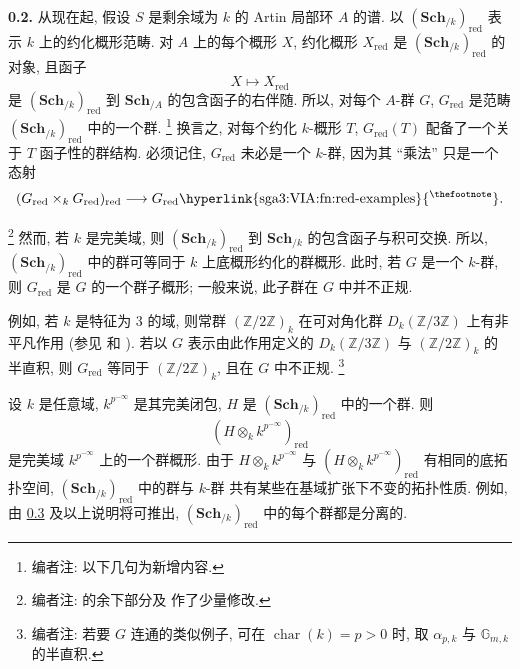 \medskip
\noindent\textbf{0.2.}
\label{sga3:VIA:0.2}
从现在起, 假设 \(S\) 是剩余域为 \(k\) 的 Artin 局部环 \(A\) 的谱.
以 \((\mathbf{Sch}_{/k})_{\mathrm{red}}\) 表示 \(k\) 上的约化概形范畴.
对 \(A\) 上的每个概形 \(X\), 约化概形 \(X_{\mathrm{red}}\)
是 \((\mathbf{Sch}_{/k})_{\mathrm{red}}\) 的对象,
且函子
\[
  X\longmapsto X_{\mathrm{red}}
\]
是 \((\mathbf{Sch}_{/k})_{\mathrm{red}}\) 到
\(\mathbf{Sch}_{/A}\) 的包含函子的右伴随.
所以, 对每个 \(A\)-群 \(G\), \(G_{\mathrm{red}}\)
是范畴 \((\mathbf{Sch}_{/k})_{\mathrm{red}}\) 中的一个群.
\footnote{编者注: 以下几句为新增内容.}
换言之, 对每个约化 \(k\)-概形 \(T\),
\(G_{\mathrm{red}}(T)\) 配备了一个关于 \(T\) 函子性的群结构.
必须记住, \(G_{\mathrm{red}}\) 未必是一个 \(k\)-群,
因为其 ``乘法'' 只是一个态射
%
\[
  (G_{\mathrm{red}}\times_k G_{\mathrm{red}})_{\mathrm{red}}
  \longrightarrow
  G_{\mathrm{red}}\text{\hyperlink{sga3:VIA:fn:red-examples}{%
    \textsuperscript{\normalfont\thefootnote}}}.
\]

\footnote{编者注:  的余下部分及
 作了少量修改.}
然而, 若 \(k\) 是完美域, 则
\((\mathbf{Sch}_{/k})_{\mathrm{red}}\) 到 \(\mathbf{Sch}_{/k}\)
的包含函子与积可交换.
所以, \((\mathbf{Sch}_{/k})_{\mathrm{red}}\) 中的群可等同于
\(k\) 上底概形约化的群概形.
此时, 若 \(G\) 是一个 \(k\)-群,
则 \(G_{\mathrm{red}}\) 是 \(G\) 的一个群子概形;
一般来说, 此子群在 \(G\) 中并不正规.

例如, 若 \(k\) 是特征为 \(3\) 的域,
则常群 \((\mathbb Z/2\mathbb Z)_k\) 在可对角化群
\(D_k(\mathbb Z/3\mathbb Z)\) 上有非平凡作用
(参见  和
).
若以 \(G\) 表示由此作用定义的 \(D_k(\mathbb Z/3\mathbb Z)\)
与 \((\mathbb Z/2\mathbb Z)_k\) 的半直积,
则 \(G_{\mathrm{red}}\) 等同于 \((\mathbb Z/2\mathbb Z)_k\),
且在 \(G\) 中不正规.
\footnote{编者注: 若要 \(G\) 连通的类似例子,
可在 \(\operatorname{char}(k)=p>0\) 时,
取 \(\alpha_{p,k}\) 与 \(\mathbb G_{m,k}\) 的半直积.}

设 \(k\) 是任意域, \(k^{p^{-\infty}}\) 是其完美闭包,
\(H\) 是 \((\mathbf{Sch}_{/k})_{\mathrm{red}}\) 中的一个群. 则
\[
  (H\otimes_k k^{p^{-\infty}})_{\mathrm{red}}
\]
是完美域 \(k^{p^{-\infty}}\) 上的一个群概形.
由于 \(H\otimes_k k^{p^{-\infty}}\) 与
\((H\otimes_k k^{p^{-\infty}})_{\mathrm{red}}\)
有相同的底拓扑空间,
\((\mathbf{Sch}_{/k})_{\mathrm{red}}\) 中的群与 \(k\)-群
共有某些在基域扩张下不变的拓扑性质.
例如, 由 \hyperref[sga3:VIA:0.3]{0.3} 及以上说明将可推出,
\((\mathbf{Sch}_{/k})_{\mathrm{red}}\) 中的每个群都是分离的.

